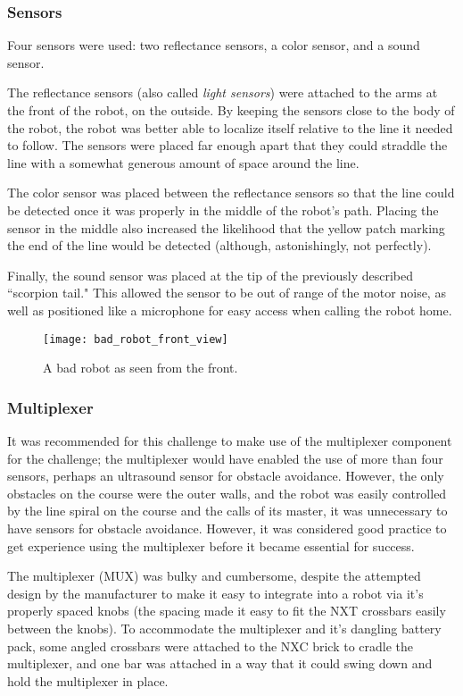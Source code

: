 \documentclass{article}
\begin{document}
\subsubsection{Sensors}
Four sensors were used: two reflectance sensors, a color sensor, and a sound sensor.

The reflectance sensors (also called \textit{light sensors}) were attached to the arms at the front of the robot, on the outside. By keeping the sensors close to the body of the robot, the robot was better able to localize itself relative to the line it needed to follow. The sensors were placed far enough apart that they could straddle the line with a somewhat generous amount of space around the line.

The color sensor was placed between the reflectance sensors so that the line could be detected once it was properly in the middle of the robot's path. Placing the sensor in the middle also increased the likelihood that the yellow patch marking the end of the line would be detected (although, astonishingly, not perfectly).

Finally, the sound sensor was placed at the tip of the previously described ``scorpion tail." This allowed the sensor to be out of range of the motor noise, as well as positioned like a microphone for easy access when calling the robot home.


    \begin{figure}[h!]
    \centering
    \texttt{[image: bad\_robot\_front\_view]}
    \caption{A bad robot as seen from the front.}
    \label{fig:bad_robot_front_view}
    \end{figure}

\subsubsection{Multiplexer}
It was recommended for this challenge to make use of the multiplexer component for the challenge; the multiplexer would have enabled the use of more than four sensors, perhaps an ultrasound sensor for obstacle avoidance. However, the only obstacles on the course were the outer walls, and the robot was easily controlled by the line spiral on the course and the calls of its master, it was unnecessary to have sensors for obstacle avoidance. However, it was considered good practice to get experience using the multiplexer before it became essential for success.

The multiplexer (MUX) was bulky and cumbersome, despite the attempted design by the manufacturer to make it easy to integrate into a robot via it's properly spaced knobs (the spacing made it easy to fit the NXT crossbars easily between the knobs). To accommodate the multiplexer and it's dangling battery pack, some angled crossbars were attached to the NXC brick to cradle the multiplexer, and one bar was attached in a way that it could swing down and hold the multiplexer in place.
\end{document}
